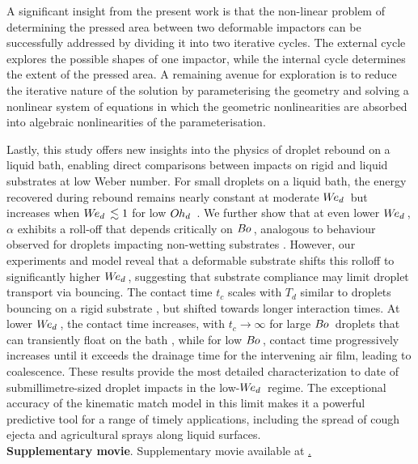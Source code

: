 \documentclass{jfm}
\newcommand{\Ohd}{O\kern-0.04em h_d\,}
\newcommand{\Bo}{B\kern-0.04em o\,}
\newcommand{\Wed}{W\kern-0.15em e _d\,}
\begin{document}
A significant insight from the present work is that the non-linear problem of determining the pressed area between two deformable impactors can be successfully addressed by dividing it into two iterative cycles. The external cycle explores the possible shapes of one impactor, while the internal cycle determines the extent of the pressed area. A remaining avenue for exploration is to reduce the iterative nature of the solution by parameterising the geometry and solving a nonlinear system of equations in which the geometric nonlinearities are absorbed into algebraic nonlinearities of the parameterisation.

Lastly, this study offers new insights into the physics of droplet rebound on a liquid bath, enabling direct comparisons between impacts on rigid and liquid substrates at low Weber number. For small droplets on a liquid bath, the energy recovered during rebound remains nearly constant at moderate $\Wed$ but increases when $\Wed \lesssim 1$ for low $\Ohd$ \citep{zhao2011transition,wu2020small,AlventosaEtAl2023}. We further show that at even lower $\Wed$, $\alpha$ exhibits a roll-off that depends critically on $\Bo$, analogous to behaviour observed for droplets impacting non-wetting substrates \citep{GabbardEtAl2025}. However, our experiments and model reveal that a deformable substrate shifts this rolloff to significantly higher $\Wed$, suggesting that substrate compliance may limit droplet transport via bouncing. The contact time $t_{c}$ scales with $T_{d}$ \citep{zhao2011transition,AlventosaEtAl2023} similar to droplets bouncing on a rigid substrate \citep{richard2002contact}, but shifted towards longer interaction times. At lower $\Wed$, the contact time increases, with $t_{c} \rightarrow \infty$ for large $\Bo$ droplets that can transiently float on the bath \citep{CouderEtAl2005Noncoalescence}, while for low $\Bo$, contact time progressively increases until it exceeds the drainage time for the intervening air film, leading to coalescence. These results provide the most detailed characterization to date of submillimetre-sized droplet impacts in the low-$\Wed$ regime. The exceptional accuracy of the kinematic match model in this limit makes it a powerful predictive tool for a range of timely applications, including the spread of cough ejecta \citep{bourouiba2021fluid} and agricultural sprays \citep{makhnenko2021review} along liquid surfaces. \\


{\small \noindent \textbf{Supplementary movie}. Supplementary movie available at \href{https://doi.org/10.1017/jfm.2026.11291}.}
\end{document}
